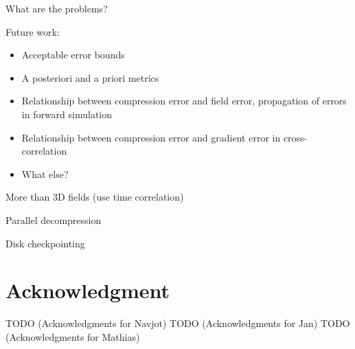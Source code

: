 \documentclass[conference]{IEEEtran}
\begin{document}
What are the problems?

Future work:
\begin{itemize}
\item Acceptable error bounds
\item A posteriori and a priori metrics
\item Relationship between compression error and field error, propagation of errors in forward simulation
\item Relationship between compression error and gradient error in cross-correlation
\item What else?
\end{itemize}

More than 3D fields (use time correlation)

Parallel decompression

Disk checkpointing

\section*{Acknowledgment}

TODO (Acknowledgments for Navjot)
TODO (Acknowledgments for Jan)
TODO (Acknowledgments for Mathias)



\end{document}
